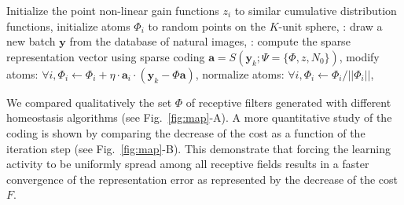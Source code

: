 \documentclass[letterpaper,final,conference,10pt]{IEEEtran}
\newcommand{\citep}[1]{\cite{#1}}
\newcommand{\coef}{\mathbf{a}} %
\newcommand{\image}{\mathbf{y}} %
\newcommand{\dico}{\Phi} %
\newcommand{\norm}[1]{|\!| #1 |\!|}
\newcommand{\seeEq}[1]{Eq.~\ref{eq:#1}}%
\begin{document}
\begin{algorithmic}[1]
\State Initialize the point non-linear gain functions $z_i$ to similar cumulative distribution functions,%
\State initialize atoms $\dico_i$ to random points on the $K$-unit sphere,
: %
\State draw a new batch  $\image$ from the database of natural images,%
\For{ each data point $\image_k$}: %
\State  compute the sparse representation vector using sparse coding $\coef = S(\image_k; \Psi=\{\dico, z, N_0\})$,
\State modify atoms: $\forall i, \dico_{i} \leftarrow \dico_{i} + \eta \cdot \coef_{i} \cdot (\image_k - \dico \coef)$,%
\State normalize atoms: $\forall i, \dico_{i} \leftarrow \dico_{i} / \norm{\dico_{i}}$,%
\EndFor
\EndFor
\end{algorithmic}
%

We compared qualitatively the set $\dico$ of receptive filters generated with different homeostasis algorithms (see Fig.~\ref{fig:map}-A). A more quantitative study of the coding is shown by comparing the decrease of the cost as a function of the iteration step (see Fig.~\ref{fig:map}-B). This demonstrate that forcing the learning activity to be uniformly spread among all receptive fields results in a faster convergence of the representation error as represented by the decrease of the cost $F$. %
\end{document}
